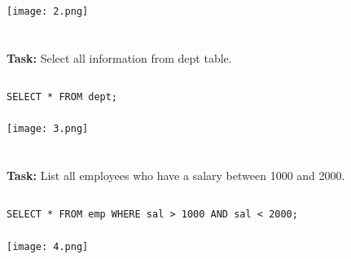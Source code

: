 \documentclass[12pt,a4paper]{article}
\begin{document}
\subsubsection{}
\begin{center}
    \texttt{[image: 2.png]}
\end{center}


\section{}
\textbf{Task:} Select all information from dept table.

\subsection{}
\begin{lstlisting}
SELECT * FROM dept;

\end{lstlisting}

\subsubsection{}
\begin{center}
    \texttt{[image: 3.png]}
\end{center}


\section{}
\textbf{Task:} List all employees who have a salary between 1000 and 2000.

\subsection{}
\begin{lstlisting}
SELECT * FROM emp WHERE sal > 1000 AND sal < 2000;

\end{lstlisting}

\subsubsection{}
\begin{center}
    \texttt{[image: 4.png]}
\end{center}

\end{document}
